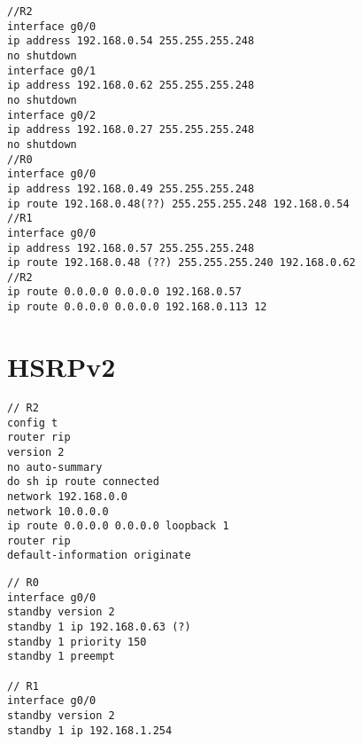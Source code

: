 \begin{verbatim}
//R2
interface g0/0
ip address 192.168.0.54 255.255.255.248
no shutdown
interface g0/1
ip address 192.168.0.62 255.255.255.248
no shutdown
interface g0/2
ip address 192.168.0.27 255.255.255.248
no shutdown
//R0
interface g0/0
ip address 192.168.0.49 255.255.255.248
ip route 192.168.0.48(??) 255.255.255.248 192.168.0.54
//R1
interface g0/0
ip address 192.168.0.57 255.255.255.248
ip route 192.168.0.48 (??) 255.255.255.240 192.168.0.62
//R2
ip route 0.0.0.0 0.0.0.0 192.168.0.57
ip route 0.0.0.0 0.0.0.0 192.168.0.113 12
\end{verbatim}

\section{HSRPv2}

\begin{verbatim}
// R2
config t
router rip
version 2
no auto-summary
do sh ip route connected
network 192.168.0.0
network 10.0.0.0
ip route 0.0.0.0 0.0.0.0 loopback 1
router rip
default-information originate
\end{verbatim}

\begin{verbatim}
// R0
interface g0/0
standby version 2
standby 1 ip 192.168.0.63 (?)
standby 1 priority 150
standby 1 preempt

// R1
interface g0/0
standby version 2
standby 1 ip 192.168.1.254
\end{verbatim}